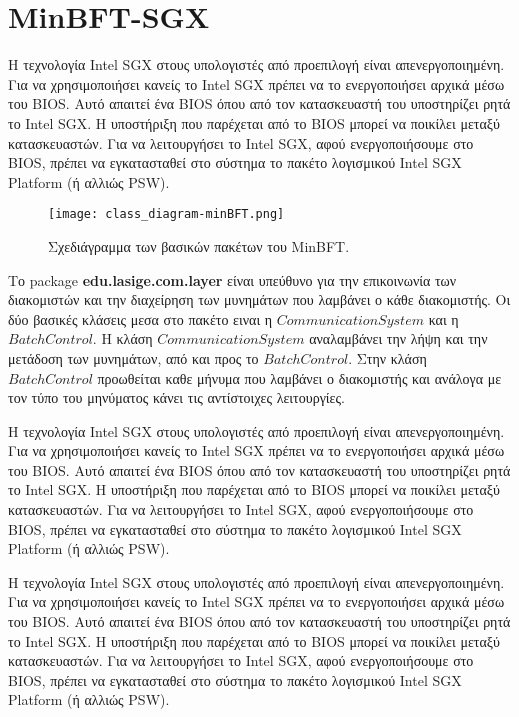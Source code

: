 \section{MinBFT-SGX}
Η τεχνολογία Intel SGX στους υπολογιστές από προεπιλογή είναι απενεργοποιημένη. Για να χρησιμοποιήσει κανείς το Intel SGX πρέπει να το ενεργοποιήσει αρχικά μέσω του BIOS. Αυτό απαιτεί ένα BIOS όπου από τον κατασκευαστή του υποστηρίζει ρητά το Intel SGX. Η υποστήριξη που παρέχεται από το BIOS μπορεί να ποικίλει μεταξύ κατασκευαστών. Για να λειτουργήσει το Intel SGX, αφού ενεργοποιήσουμε στο BIOS, πρέπει να εγκατασταθεί στο σύστημα το πακέτο λογισμικού Intel SGX Platform (ή αλλιώς PSW)\cite{linuxsgx}. 

\begin{figure}
\centering
\texttt{[image: class\_diagram-minBFT.png]}
\caption{Σχεδιάγραμμα των βασικών πακέτων του MinBFT.}
\label{fig:classdiagram}
\end{figure}

Το package \textbf{edu.lasige.com.layer} είναι υπεύθυνο για την επικοινωνία των διακομιστών και την διαχείρηση των μυνημάτων που λαμβάνει ο κάθε διακομιστής. Οι δύο βασικές κλάσεις μεσα στο πακέτο ειναι η $CommunicationSystem$ και η $BatchControl$. Η κλάση $CommunicationSystem$ αναλαμβάνει την λήψη και την μετάδοση των μυνημάτων, από και προς το $BatchControl$. Στην κλάση $BatchControl$ προωθείται καθε μήνυμα που λαμβάνει ο διακομιστής και ανάλογα με τον τύπο του μηνύματος κάνει τις αντίστοιχες λειτουργίες.

Η τεχνολογία Intel SGX στους υπολογιστές από προεπιλογή είναι απενεργοποιημένη. Για να χρησιμοποιήσει κανείς το Intel SGX πρέπει να το ενεργοποιήσει αρχικά μέσω του BIOS. Αυτό απαιτεί ένα BIOS όπου από τον κατασκευαστή του υποστηρίζει ρητά το Intel SGX. Η υποστήριξη που παρέχεται από το BIOS μπορεί να ποικίλει μεταξύ κατασκευαστών. Για να λειτουργήσει το Intel SGX, αφού ενεργοποιήσουμε στο BIOS, πρέπει να εγκατασταθεί στο σύστημα το πακέτο λογισμικού Intel SGX Platform (ή αλλιώς PSW)\cite{linuxsgx}. 

Η τεχνολογία Intel SGX στους υπολογιστές από προεπιλογή είναι απενεργοποιημένη. Για να χρησιμοποιήσει κανείς το Intel SGX πρέπει να το ενεργοποιήσει αρχικά μέσω του BIOS. Αυτό απαιτεί ένα BIOS όπου από τον κατασκευαστή του υποστηρίζει ρητά το Intel SGX. Η υποστήριξη που παρέχεται από το BIOS μπορεί να ποικίλει μεταξύ κατασκευαστών. Για να λειτουργήσει το Intel SGX, αφού ενεργοποιήσουμε στο BIOS, πρέπει να εγκατασταθεί στο σύστημα το πακέτο λογισμικού Intel SGX Platform (ή αλλιώς PSW)\cite{linuxsgx}. 

